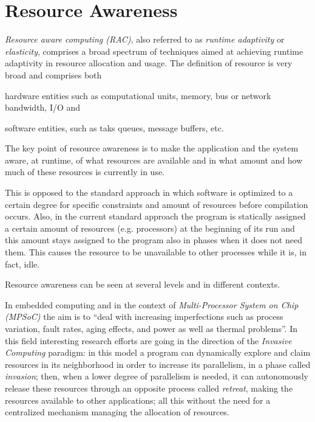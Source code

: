 
\section{Resource Awareness} \label{sec:resourceAwareness}

\emph{Resource aware computing (RAC)}, also referred to as \emph{runtime adaptivity} or \emph{elasticity}, comprises a broad spectrum of techniques aimed at achieving runtime adaptivity in resource allocation and usage. The definition of resource is very broad and comprises both 
\begin{enumerate*}[label={(\roman*)}]
	\item hardware entities such as computational units, memory, bus or network bandwidth, I/O and
	\item software entities, such as taks queues, message buffers, etc.
\end{enumerate*}

The key point of resource awareness is to make the application and the system aware, at runtime, of what resources are available and in what amount and how much of these resources is currently in use.

This is opposed to the standard approach in which software is optimized to a certain degree for specific constraints and amount of resources before compilation occurs.
Also, in the current standard approach the program is statically assigned a certain amount of resources (e.g. processors) at the beginning of its run and this amount stays assigned to the program also in phases when it does not need them. This causes the resource to be unavailable to other processes while it is, in fact, idle.

Resource awareness can be seen at several levels and in different contexts.

In embedded computing and in the context of \emph{Multi-Processor System on Chip (MPSoC)} the aim is to ``deal with increasing imperfections such as process variation, fault rates, aging effects, and power as well as thermal problems''\cite{hannig2011resource}. In this field interesting research efforts are going in the direction of the \emph{Invasive Computing}\cite{teich2011invasive} paradigm: in this model a program can dynamically explore and claim resources in its neighborhood in order to increase its parallelism, in a phase called \emph{invasion}; then, when a lower degree of parallelism is needed, it can autonomously release these resources through an opposite process called \emph{retreat}, making the resources available to other applications; all this without the need for a centralized mechanism managing the allocation of resources.

